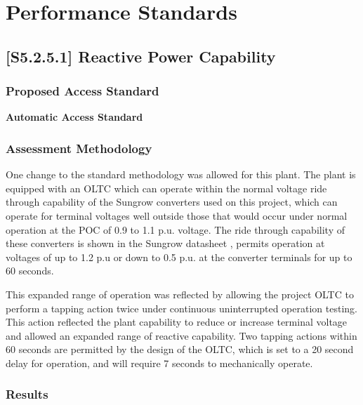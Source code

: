 \documentclass{../grid-link-report}
\newcommand{\projectassetsdir}{../project-assets}
\begin{document}
	
	
	\chapter{Performance Standards}
	\section{[S5.2.5.1] Reactive Power Capability}
	\subsection{Proposed Access Standard}
	\textbf{Automatic Access Standard}
	\begin{tcolorbox}[lightgreenbox]
		
	\end{tcolorbox}
	
	
	\subsection{Assessment Methodology}
	
	
	One change to the standard methodology was allowed for this plant. The plant is equipped with an OLTC which can operate within the normal voltage ride through capability of the Sungrow converters used on this project, which can operate for terminal voltages well outside those that would occur under normal operation at the POC of 0.9 to 1.1 p.u. voltage. The ride through capability of these converters is shown in the Sungrow datasheet \cite{sungrow-lvrt-and-hvrt}, permits operation at voltages of up to 1.2 p.u or down to 0.5 p.u. at the converter terminals for up to 60 seconds.
	
	This expanded range of operation was reflected by allowing the project OLTC to perform a tapping action twice under continuous uninterrupted operation testing. This action reflected the plant capability to reduce or increase terminal voltage and allowed an expanded range of reactive capability. Two tapping actions within 60 seconds are permitted by the design of the OLTC, which is set to a 20 second delay for operation, and will require 7 seconds to mechanically operate.
	
	\subsection{Results}
	
\end{document}
